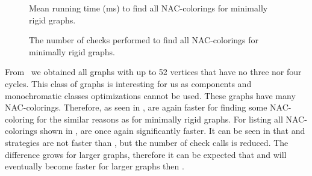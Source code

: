 \begin{figure}[p]
	\centering
	\scalebox{0.5}{}
	\caption[Mean runtime for minimally rigid graphs (some).]{
		Mean running time (ms) to find all NAC-colorings for minimally rigid graphs.}%
	\label{fig:graph_minimally_rigid_first_runtime}
\end{figure}
\begin{figure}[p]
	\centering
	\scalebox{0.5}{}
	\caption[Checks performed for minimally rigid graphs (some).]{
		The number of checks performed to find all NAC-colorings for minimally rigid graphs.}%
	\label{fig:graph_minimally_rigid_first_checks}
\end{figure}


From~\cite{extremal_graphs} we obtained all graphs with up to 52 vertices
that have no three nor four cycles. This class of graphs is interesting for us
as \trcon{} components and monochromatic classes optimizations cannot be used.
These graphs have many NAC-colorings.
Therefore, as seen in ,
\NaiveCycles{} are again faster for finding some NAC-coloring
for the similar reasons as for minimally rigid graphs.
For listing all NAC-colorings shown in ,
\Subgraphs{} are once again significantly faster.
It can be seen in 
that \Neighbors{} and \CyclesMatchChunks{} strategies are not faster than \None{},
but the number of \IsNACColoring{} check calls is reduced.
The difference grows for larger graphs, therefore it can be expected
that \Neighbors{} and \CyclesMatchChunks{} will eventually become faster
for larger graphs then \None{}.

